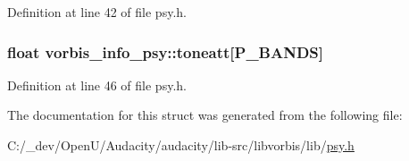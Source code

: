 Definition at line 42 of file psy.\+h.

\subsubsection[{\texorpdfstring{toneatt}{toneatt}}]{\setlength{\rightskip}{0pt plus 5cm}float vorbis\+\_\+info\+\_\+psy\+::toneatt\mbox{[}{\bf P\+\_\+\+B\+A\+N\+DS}\mbox{]}}\hypertarget{structvorbis__info__psy_ab8ef339e8d8ae469c1ae7ba706534a91}{}\label{structvorbis__info__psy_ab8ef339e8d8ae469c1ae7ba706534a91}


Definition at line 46 of file psy.\+h.



The documentation for this struct was generated from the following file\+:\begin{DoxyCompactItemize}
\item 
C\+:/\+\_\+dev/\+Open\+U/\+Audacity/audacity/lib-\/src/libvorbis/lib/\hyperlink{psy_8h}{psy.\+h}\end{DoxyCompactItemize}

